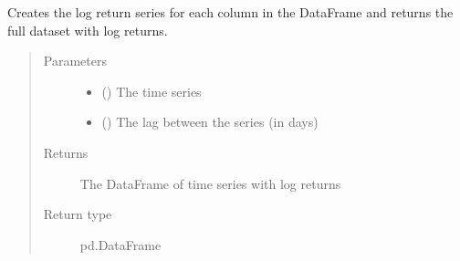 \documentclass[letterpaper,10pt,english]{sphinxmanual}
\begin{document}
\begin{fulllineitems}
\label{\detokenize{preprocessing:Foresight.preprocessing.generate_lg_return}}
Creates the log return series for each column in the DataFrame
and returns the full dataset with log returns.
\begin{quote}\begin{description}
\item[{Parameters}] \leavevmode\begin{itemize}
\item {} 
 () \textendash{} The time series

\item {} 
 () \textendash{} The lag between the series (in days)

\end{itemize}

\item[{Returns}] \leavevmode
The DataFrame of time series with log returns

\item[{Return type}] \leavevmode
pd.DataFrame

\end{description}\end{quote}

\end{fulllineitems}

\end{document}
